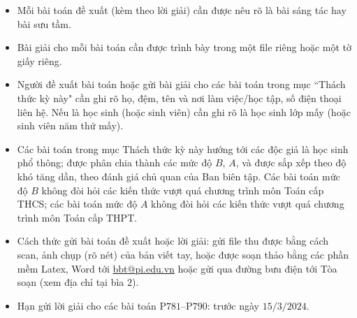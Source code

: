 \thispagestyle{thachthuctoanhocnone}
\pagestyle{thachthuctoanhoc}
\everymath{\color{thachthuctoanhoc}}
\graphicspath{{../thachthuctoanhoc/pic/}}
\begingroup
{}
\centering
\vspace*{4cm}
\endgroup
\vspace*{-8pt}
\begin{tBox}
	\begin{itemize}[leftmargin = 13pt, itemsep = 1.0pt] 
		\item Mỗi bài toán đề xuất (kèm theo lời giải) cần được nêu rõ là bài sáng tác hay bài sưu tầm.
		\item Bài giải cho mỗi bài toán cần được trình bày trong một file riêng hoặc
		một tờ giấy riêng.
		\item  Người đề xuất bài toán hoặc gửi bài giải cho các bài toán trong mục ``Thách thức kỳ này" cần ghi rõ họ, đệm, tên và nơi làm việc/học tập, số điện thoại liên hệ. Nếu là học sinh (hoặc sinh viên) cần ghi rõ là học sinh lớp mấy (hoặc sinh viên năm thứ mấy).
		\item Các bài toán trong mục Thách thức kỳ này hướng tới các độc giả là học sinh phổ thông; được phân chia thành các mức độ $B$, $A$, và được sắp xếp theo độ khó tăng dần, theo đánh giá chủ quan của Ban biên tập. Các bài toán mức độ $B$ không đòi hỏi các kiến thức vượt quá chương trình môn Toán cấp THCS; các bài toán mức độ $A$ không đòi hỏi các kiến thức vượt quá chương trình môn Toán cấp THPT.
		\item Cách thức gửi bài toán đề xuất hoặc lời giải: gửi file thu được bằng cách scan, ảnh chụp (rõ nét) của bản viết tay, hoặc được soạn thảo bằng các phần mềm Latex, Word tới \url{bbt@pi.edu.vn} hoặc gửi qua đường bưu điện tới Tòa soạn (xem địa chỉ tại bìa $2$).
		\item Hạn gửi lời giải cho các bài toán P$781$--P$790$: trước ngày $15/3/2024$.
	\end{itemize}
\end{tBox}
